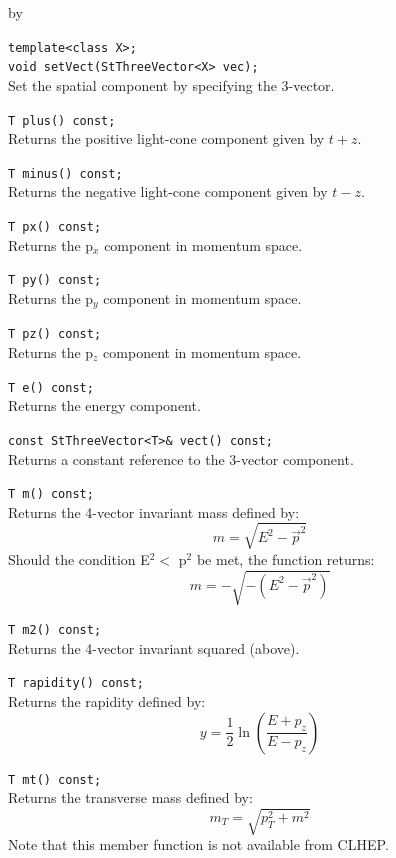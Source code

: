 \documentclass[twoside]{article}
\newcommand{\entrylabel}[1]{\mbox{\textbf{{#1}}}\hfil}%
\newenvironment{entry}
{\begin{list}{}%
    {\renewcommand{\makelabel}{\entrylabel}%
     \setlength{\labelwidth}{90pt}%
     \setlength{\leftmargin}{\labelwidth}
     \advance\leftmargin by \labelsep%
      }%
    }%
  {\end{list}}
\newcommand{\Entrylabel}[1]%
{\raisebox{0pt}[1ex][0pt]{\makebox[\labelwidth][l]%
    {\parbox[t]{\labelwidth}{\hspace{0pt}\textbf{{#1}}}}}}
\newenvironment{Entry}%
{\renewcommand{\entrylabel}{\Entrylabel}\begin{entry}}%
  {\end{entry}}
\begin{document}
\begin{description}
\begin{Entry}
    \verb+template<class X>;+\\
    \verb+void setVect(StThreeVector<X> vec);+\\
    Set the spatial component by specifying the 3-vector.

    \verb+T plus() const;+\\
    Returns the positive light-cone component given
    by $t+z$.

    \verb+T minus() const;+\\
    Returns the negative light-cone component given
    by $t-z$.
    
    \verb+T px() const;+\\
    Returns the p$_{x}$ component in momentum space.
    
    \verb+T py() const;+\\
    Returns the p$_{y}$ component in momentum space.
    
    \verb+T pz() const;+\\
    Returns the p$_{z}$ component in momentum space.

    \verb+T e() const;+\\
    Returns the energy component.

    \verb+const StThreeVector<T>& vect() const;+\\
    Returns a constant reference to the 3-vector component.

    \verb+T m() const;+\\
    Returns the 4-vector invariant mass defined
    by:
    \begin{equation*}
      m = \sqrt{E^{2} - \vec{p}^{2}}
    \end{equation*}
    Should the condition E$^{2} < $ p$^{2}$ be met, the
    function returns:
   \begin{equation*}
      m = -\sqrt{-(E^{2} - \vec{p}^{2})}
    \end{equation*}    

    \verb+T m2() const;+\\
    Returns the 4-vector invariant squared (above).
    
    \verb+T rapidity() const;+\\    
    Returns the rapidity defined by: \\
    \begin{equation*}
      y = \frac{1}{2} \ln(\frac{E+p_{z}}{E-p_{z}})
    \end{equation*}

    \verb+T mt() const;+\\    
    Returns the transverse mass defined by: \\
    \begin{equation*}
      m_{T} = \sqrt{p_{T}^{2} + m^{2}}
    \end{equation*}
    Note that this member function is not available
    from CLHEP.


\end{Entry}
\end{description}
\end{document}
